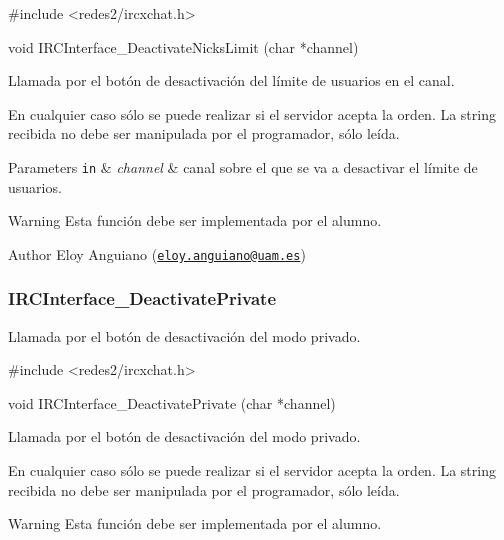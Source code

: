 \begin{DoxyCode}
\textcolor{preprocessor}{#include <redes2/ircxchat.h>}

\textcolor{keywordtype}{void} IRCInterface\_DeactivateNicksLimit (\textcolor{keywordtype}{char} *channel)
\end{DoxyCode}


Llamada por el botón de desactivación del límite de usuarios en el canal.

En cualquier caso sólo se puede realizar si el servidor acepta la orden. La string recibida no debe ser manipulada por el programador, sólo leída.


\begin{DoxyParams}[1]{Parameters}
\mbox{\tt in}  & {\em channel} & canal sobre el que se va a desactivar el límite de usuarios.\\
\hline
\end{DoxyParams}
\begin{DoxyWarning}{Warning}
Esta función debe ser implementada por el alumno.
\end{DoxyWarning}
\begin{DoxyAuthor}{Author}
Eloy Anguiano (\href{mailto:eloy.anguiano@uam.es}{\tt eloy.\+anguiano@uam.\+es})
\end{DoxyAuthor}


 \hypertarget{IRCInterface_DeactivatePrivate}{}\subsubsection{I\+R\+C\+Interface\+\_\+\+Deactivate\+Private}\label{IRCInterface_DeactivatePrivate}
Llamada por el botón de desactivación del modo privado.


\begin{DoxyCode}
\textcolor{preprocessor}{#include <redes2/ircxchat.h>}

\textcolor{keywordtype}{void} IRCInterface\_DeactivatePrivate (\textcolor{keywordtype}{char} *channel)
\end{DoxyCode}


Llamada por el botón de desactivación del modo privado.

En cualquier caso sólo se puede realizar si el servidor acepta la orden. La string recibida no debe ser manipulada por el programador, sólo leída.

\begin{DoxyWarning}{Warning}
Esta función debe ser implementada por el alumno.
\end{DoxyWarning}

